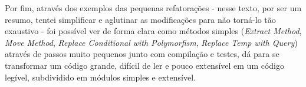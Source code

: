 \documentclass[12pt, a4paper]{article}
\newcommand{\tit}[1]{\textit{#1}}
\begin{document}
    Por fim, através dos exemplos das pequenas refatorações - nesse texto, por ser um resumo, tentei simplificar e aglutinar as modificações para não torná-lo tão exaustivo - foi possível ver de forma clara como métodos simples (\tit{Extract Method}, \tit{Move Method}, \tit{Replace Conditional with Polymorfism}, \tit{Replace Temp with Query}) através de passos muito pequenos junto com compilação e testes, dá para se transformar um código grande, difícil de ler e pouco extensível em um código legível, subdividido em módulos simples e extensível.
    
    
    
    
            
            
    
    
\end{document}
